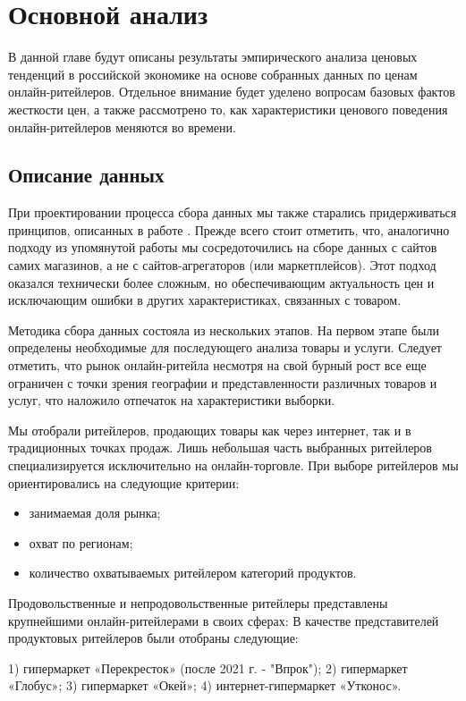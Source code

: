 \chapter{Основной анализ}\label{ch:ch3}

В данной главе будут описаны результаты эмпирического анализа ценовых тенденций в российской экономике на основе собранных данных по ценам онлайн-ритейлеров. Отдельное внимание будет уделено вопросам базовых фактов жесткости цен, а также рассмотрено то, как характеристики ценового поведения онлайн-ритейлеров меняются во времени.

\section{Описание данных}\label{sec:ch3/sec1}

При проектировании процесса сбора данных мы также старались придерживаться принципов, описанных в работе \cite{cavallo2016billion}. Прежде всего стоит отметить, что, аналогично подходу из упомянутой работы мы сосредоточились на сборе данных с сайтов самих магазинов, а не с сайтов-агрегаторов (или маркетплейсов). Этот подход оказался технически более сложным, но обеспечивающим актуальность цен и исключающим ошибки в других характеристиках, связанных с товаром.

Методика сбора данных состояла из нескольких этапов. На первом этапе были определены необходимые для последующего анализа товары и услуги. Следует отметить, что рынок онлайн-ритейла несмотря на свой бурный рост все еще ограничен с точки зрения географии и представленности различных товаров и услуг, что наложило отпечаток на характеристики выборки.

Мы отобрали ритейлеров, продающих товары как через интернет, так и в традиционных точках продаж. Лишь небольшая часть выбранных ритейлеров специализируется исключительно на онлайн-торговле. При выборе ритейлеров мы ориентировались на следующие критерии:
\begin{itemize}
	\item занимаемая доля рынка;
	\item охват по регионам;
	\item количество охватываемых ритейлером категорий продуктов.
\end{itemize}
Продовольственные и непродовольственные ритейлеры представлены крупнейшими онлайн-ритейлерами в своих сферах:
В качестве представителей продуктовых ритейлеров были отобраны следующие:

1) гипермаркет «Перекресток» (после 2021 г. - "Впрок");
2) гипермаркет «Глобус»;
3) гипермаркет «Окей»;
4) интернет-гипермаркет «Утконос».

